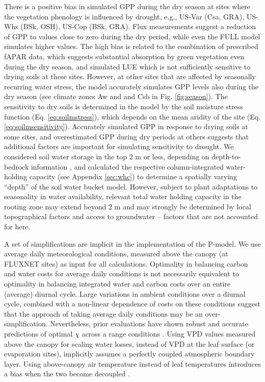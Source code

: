 \documentclass{myreport}
\begin{document}
There is a positive bias in simulated GPP during the dry season at sites where the vegetation phenology is influenced by drought, e.g., US-Var (Csa, GRA), US-Whs (BSk, OSH), US-Cop (BSk, GRA). Flux measurements suggest a reduction of GPP to values close to zero during the dry period, while even the FULL model simulates higher values. The high bias is related to the combination of prescribed fAPAR data, which suggests substantial absorption by green vegetation even during the dry season, and simulated LUE which is not sufficiently sensitive to drying soils at these sites. However, at other sites that are affected by seasonally recurring water stress, the model accurately simulates GPP levels also during the dry season (see climate zones Aw and and Csb in Fig. \ref{fig:season}). The sensitivity to dry soils is determined in the model by the soil moisture stress function (Eq. \ref{eq:soilmstress}), which depends on the mean aridity of the site (Eq. \ref{eq:soilmsensitivity}). Accurately simulated GPP in response to drying soils at some sites, and overestimated GPP during dry periods at others suggests that additional factors are important for simulating sensitivity to drought. We considered soil water storage in the top 2 m or less, depending on depth-to-bedrock information \citep{Hengl2014-jm}, and calculated the respective column-integrated water-holding capacity (see Appendix \ref{sec:whc}) to determine a spatially varying ``depth'' of the soil water bucket model. However, subject to plant adaptations to seasonality in water availability, relevant total water holding capacity in the rooting zone may extend beyond 2 m  \citep{yang16wrr} and may strongly be determined by local topographical factors and access to groundwater \citep{fan13sci, fan17pnas} -- factors that are not accounted for here.

A set of simplifications are implicit in the implementation of the P-model. We use average daily meteorological conditions, measured above the canopy (at FLUXNET sites) as input for all calculations. Optimality in balancing carbon and water costs for average daily conditions is not necessarily equivalent to optimality in balancing integrated water and carbon costs over an entire (average) diurnal cycle. Large variations in ambient conditions over a diurnal cycle, combined with a non-linear dependence of costs on these conditions suggest that the approach of taking average daily conditions may be an over-simplification. Nevertheless, prior evaluations have shown robust and accurate predictions of optimal $\chi$ across a range conditions \citep{wang17natpl}. Using VPD values measured above the canopy for scaling water losses, instead of VPD at the leaf surface (or evaporation sites), implicitly assumes a perfectly coupled atmospheric boundary layer. Using above-canopy air temperature instead of leaf temperatures introduces a bias when the two become decoupled \citep{michaletz15tee}. %
\end{document}
